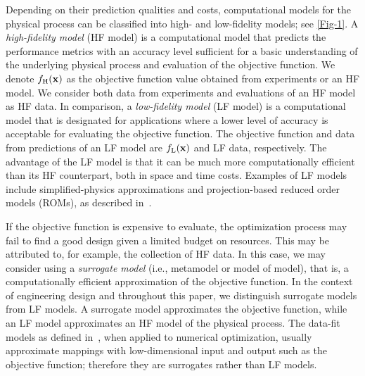 \documentclass[iicol,sn-basic]{sn-jnl}%
\begin{document}
Depending on their prediction qualities and costs, computational models for the physical process can be classified into high- and low-fidelity models; see \cref{Fig-1}.
A \textit{high-fidelity model} (HF model) is a computational model that predicts the performance metrics with an accuracy level sufficient for a basic understanding of the underlying physical process and evaluation of the objective function.
We denote $f_\text{H}(\bf x)$ as the objective function value obtained from experiments or an HF model.
We consider both data from experiments and evaluations of an HF model as HF data.
In comparison, a \textit{low-fidelity model} (LF model) is a computational model that is designated for applications where a lower level of accuracy is acceptable for evaluating the objective function.
The objective function and data from predictions of an LF model are $f_\text{L}(\bf x)$ and LF data, respectively.
The advantage of the LF model is that it can be much more computationally efficient than its HF counterpart, both in space and time costs.
Examples of LF models include simplified-physics approximations and projection-based reduced order models (ROMs), as described in~\cite{Peherstorfer2018}.

If the objective function is expensive to evaluate, the optimization process may fail to find a good design given a limited budget on resources.
This may be attributed to, for example, the collection of HF data.
In this case, we may consider using a \textit{surrogate model} (i.e., metamodel or model of model), that is, a computationally efficient approximation of the objective function.
In the context of engineering design and throughout this paper, we distinguish surrogate models from LF models.
A surrogate model approximates the objective function, while an LF model approximates an HF model of the physical process.
The data-fit models as defined in~\cite{Peherstorfer2018}, when applied to numerical optimization, usually approximate mappings with low-dimensional input and output such as the objective function; therefore they are surrogates rather than LF models.
\end{document}
